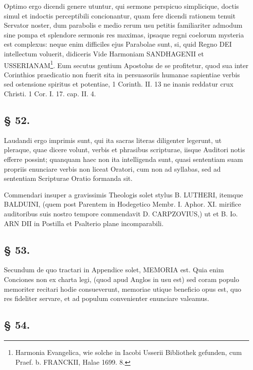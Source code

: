 Optimo ergo dicendi genere utuntur, qui sermone perspicuo simplicique, doctis simul et indoctis perceptibili concionantur, quam fere dicendi rationem tenuit
Servator noster, dum parabolis e medio rerum usu petitis familiariter admodum sine pompa et splendore sermonis res maximas, ipsaque regni coelorum mysteria est complexus: neque enim difficiles ejus Parabolae sunt, si, quid Regno DEI intellectum voluerit, didiceris Vide Harmoniam SANDHAGENII et USSERIANAM\footnote{Harmonia Evangelica, wie solche in Iacobi Usserii Bibliothek gefunden, cum Praef. b. FRANCKII, Halae 1699. 8.}. Eum secutus gentium Apostolus de se profitetur, quod sua inter Corinthios praedicatio non fuerit sita in persuasoriis humanae sapientiae verbis sed ostensione spiritus et potentiae, 1 Corinth. II. 13 ne inanis reddatur crux Christi. 1 Cor. I. 17. cap. II. 4.

\subsection*{§ 52.}

Laudandi ergo imprimis sunt, qui ita sacras literas diligenter legerunt, ut pleraque, quae dicere volunt, verbis et phrasibus scripturae, iisque Auditori notis efferre possint; quanquam haec non ita intelligenda sunt, quasi sententiam suam propriis enunciare verbis non liceat Oratori, cum non ad syllabas, sed ad sententiam Scripturae Oratio formanda sit.

Commendari insuper a gravissimis Theologis solet stylus B. LUTHERI, itemque BALDUINI, (quem post Parentem in Hodegetico Membr. I. Aphor. XI. mirifice auditoribus suis nostro tempore commendavit D. CARPZOVIUS,) ut et B. Io. ARN DII in Postilla et Psalterio plane incomparabili.

\subsection*{§ 53.}

Secundum de quo tractari in Appendice solet, MEMORIA est. Quia enim Conciones non ex charta legi,
(quod apud Anglos in usu est) sed coram populo memoriter recitari hodie consueverunt, memoriae utique beneficio opus est, quo res fideliter servare, et ad populum convenienter enunciare valeamus.

\subsection*{§ 54.}

